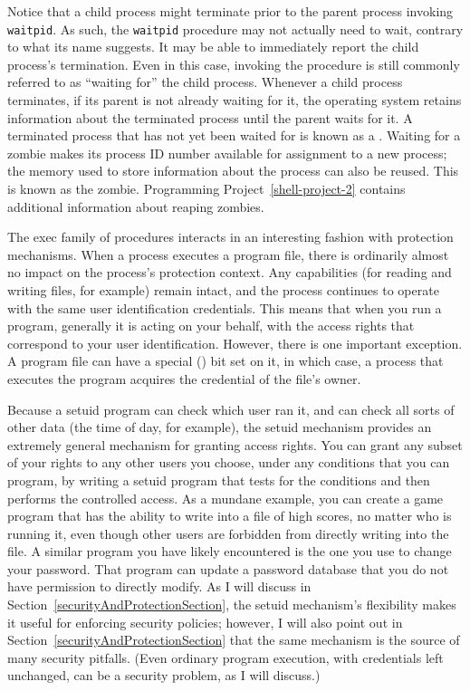 Notice that a child process might terminate prior to the parent
process invoking \verb|waitpid|.  As such, the \verb|waitpid|
procedure may not actually need to wait, contrary to what its name
suggests.  It may be able to immediately report the child process's
termination.  Even in this case, invoking the procedure is still
commonly referred to as ``waiting for'' the child process.
Whenever a child process
terminates, if its parent is not already waiting for it, the operating
system retains information about the terminated process until the
parent waits for it.  A terminated process that has not yet been waited for is
known as a .  Waiting for a zombie makes its process ID
number available for assignment to a new process; the memory used to
store information about the process can also be reused.  This is known
as  the zombie.  Programming
Project~\ref{shell-project-2} contains additional information about
reaping zombies.

The exec family of procedures interacts in an interesting fashion with
protection mechanisms.  When a process executes a program file, there
is ordinarily almost no impact on the process's protection context.
Any capabilities (for reading and writing files, for example) remain
intact, and the process continues to operate with the same user
identification credentials.  This means that when you run a program,
generally it is acting on your behalf, with the access rights that
correspond to your user identification.  However, there is one
important exception.  A program file can have a special  () bit set on it, in which case, a process
that executes the program acquires the credential of the file's
owner.

Because a setuid program can check which user ran it, and can check
all sorts of other data (the time of day, for example), the
setuid mechanism provides an extremely general mechanism for granting
access rights.  You can grant any subset of your rights to any other
users you choose, under any conditions that you can program, by
writing a setuid program that tests for the conditions and then
performs the controlled access.  As a mundane example, you can create a
game program that has the ability to write into a file of high scores,
no matter who is running it, even though other users are
forbidden from directly writing into the file.  A similar program you have likely
encountered is the one you use to change your password.  That program can update a
password database that you do not have permission to directly modify.  As I will discuss in
Section~\ref{securityAndProtectionSection}, the setuid mechanism's
flexibility makes it useful for enforcing security
policies; however, I will also point out in Section~\ref{securityAndProtectionSection} that the same
mechanism is the source of many security pitfalls.  (Even ordinary
program execution, with credentials left unchanged, can be a
security problem, as I will discuss.)

